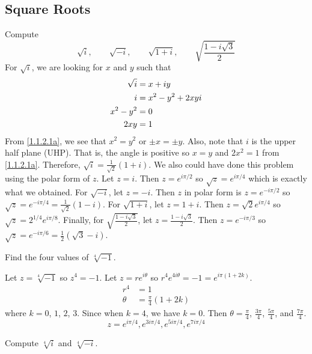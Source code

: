 \subsection{Square Roots}

\begin{exercise}
\item
  Compute
  \[
  \sqrt{i}, \qquad \sqrt{-i}, \qquad \sqrt{1 + i}, \qquad
  \sqrt{\frac{1 - i\sqrt{3}}{2}}
  \]
  For \(\sqrt{i}\), we are looking for \(x\) and \(y\) such that
  \begin{align}
    \sqrt{i} & = x + iy\notag\\
    i & = x^2 - y^2 + 2xyi\notag\\
    x^2 - y^2 & = 0\label{1.1.2.1a}\\
    2xy & = 1\label{1.1.2.1b}
  \end{align}
  From \cref{1.1.2.1a}, we see that \(x^2 = y^2\) or \(\pm x = \pm y\).
  Also, note that \(i\) is the upper half plane (UHP).
  That is, the angle is positive so \(x = y\) and \(2x^2 = 1\) from
  \cref{1.1.2.1a}.
  Therefore, \(\sqrt{i} = \frac{1}{\sqrt{2}}(1 + i)\).
  We also could have done this problem using the polar form of \(z\).
  Let \(z = i\).
  Then \(z = e^{i\pi/2}\) so \(\sqrt{z} = e^{i\pi/4}\) which is exactly what we
  obtained.
  For \(\sqrt{-i}\), let \(z = -i\).
  Then \(z\) in polar form is \(z = e^{-i\pi/2}\) so
  \(\sqrt{z} = e^{-i\pi/4} = \frac{1}{\sqrt{2}}(1 - i)\).
  For \(\sqrt{1 + i}\), let \(z = 1 + i\).
  Then \(z = \sqrt{2}e^{i\pi/4}\) so \(\sqrt{z} = 2^{1/4}e^{i\pi/8}\).
  Finally, for \(\sqrt{\frac{1 - i\sqrt{3}}{2}}\), let
  \(z = \frac{1 - i\sqrt{3}}{2}\).
  Then \(z = e^{-i\pi/3}\) so
  \(\sqrt{z} = e^{-i\pi/6} = \frac{1}{2}(\sqrt{3} - i)\).
\item
  Find the four values of \(\sqrt[4]{-1}\).
  \par\smallskip
  Let \(z = \sqrt[4]{-1}\) so \(z^4 = -1\).
  Let \(z = re^{i\theta}\) so \(r^4e^{4i\theta} = -1 = e^{i\pi(1 + 2k)}\).
    \begin{align*}
      r^4 & = 1\\
      \theta & = \frac{\pi}{4}(1 + 2k)
    \end{align*}
    where \(k = 0\), \(1\), \(2\), \(3\).
    Since when \(k = 4\), we have \(k = 0\).
    Then \(\theta = \frac{\pi}{4}\), \(\frac{3\pi}{4}\), \(\frac{5\pi}{4}\),
    and \(\frac{7\pi}{4}\).
    \[
    z = e^{i\pi/4}, e^{3i\pi/4}, e^{5i\pi/4}, e^{7i\pi/4}
    \]
\item
  Compute \(\sqrt[4]{i}\) and \(\sqrt[4]{-i}\).
  \par\smallskip

\end{exercise}
